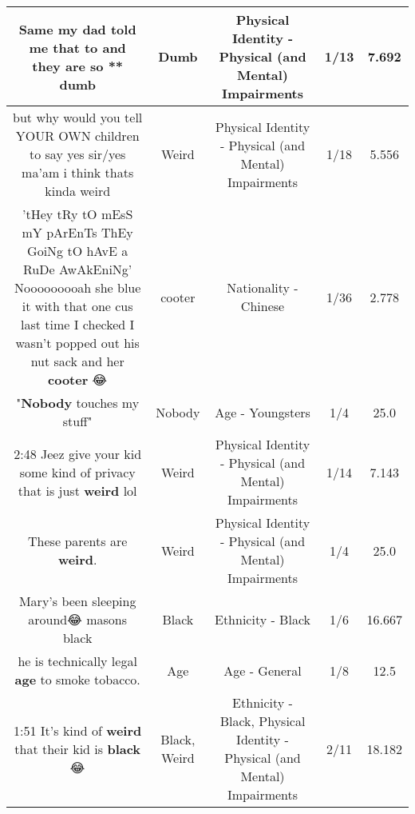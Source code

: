 \documentclass[11pt]{article}
\newlength\mylength
\begin{document}
\begin{center}
\begin{longtable}{|C{.65\mylength}|C{.30\mylength}|C{.12\mylength}|C{.12\mylength}|C{.12\mylength}|}
  \small Same my dad told me that to and they are so ** dumb\normalsize   & Dumb & Physical Identity - Physical (and Mental) Impairments & 1/13 & 7.692 \\  \hline
  \small but why would you tell YOUR OWN children to say yes sir/yes ma'am i think thats kinda weird\normalsize   & Weird & Physical Identity - Physical (and Mental) Impairments & 1/18 & 5.556 \\  \hline
  \small 'tHey tRy tO mEsS mY pArEnTs ThEy GoiNg tO hAvE a RuDe AwAkEniNg' Nooooooooah she blue it with that one cus last time I checked I wasn't popped out his nut sack and her \textbf{cooter} 😂\normalsize   & cooter & Nationality - Chinese & 1/36 & 2.778 \\  \hline
  \small "\textbf{Nobody} touches my stuff"\normalsize   & Nobody & Age - Youngsters & 1/4 & 25.0 \\  \hline
  \small 2:48 Jeez give your kid some kind of privacy that is just \textbf{weird} lol\normalsize   & Weird & Physical Identity - Physical (and Mental) Impairments & 1/14 & 7.143 \\  \hline
  \small These parents are \textbf{weird}.\normalsize   & Weird & Physical Identity - Physical (and Mental) Impairments & 1/4 & 25.0 \\  \hline
  \small Mary's been sleeping around😂 masons black\normalsize   & Black & Ethnicity - Black & 1/6 & 16.667 \\  \hline
  \small he is technically legal \textbf{age} to smoke tobacco.\normalsize   & Age & Age - General & 1/8 & 12.5 \\  \hline
  \small 1:51 It's kind of \textbf{weird} that their kid is \textbf{black} 😂\normalsize   & Black, Weird & Ethnicity - Black, Physical Identity - Physical (and Mental) Impairments & 2/11 & 18.182 \\  \hline

\end{longtable}
\end{center}
\end{document}
